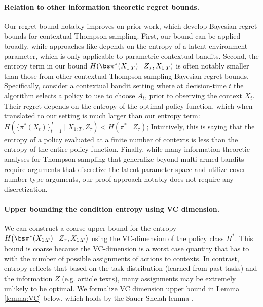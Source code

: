 \paragraph{Relation to other information theoretic regret bounds.} Our regret bound notably improves on prior work, which develop Bayesian regret bounds for contextual Thompson sampling. First, our bound can be applied broadly, while approaches like \citet{neu2022lifting} depends on the entropy of a latent environment parameter, which is only applicable to parametric contextual bandits. Second, the entropy term in our bound $H( \piX \mid Z_\tau, X_{1:T})$ is often notably smaller than those from other contextual Thompson sampling Bayesian regret bounds. Specifically, \citet{infotheoreticNonstationary} consider a contextual bandit setting where at decision-time $t$ the algorithm selects a policy to use to choose $A_t$, prior to observing the context $X_t$. Their regret depends on the entropy of the optimal policy function, which when translated to our setting is much larger than our entropy term:  $H( \{ \pi^*(X_t) \}_{t=1}^T \mid X_{1:T}, Z_\tau) < H ( \pi^* \mid Z_\tau)$; Intuitively, this is saying that the entropy of a policy evaluated at a finite number of contexts is less than the entropy of the entire policy function.
Finally, while many information-theoretic analyses for Thompson sampling that generalize beyond multi-armed bandits require arguments that discretize the latent parameter space \cite{dong2018information,gouverneur2024an,neu2022lifting,infotheoreticNonstationary} and utilize cover-number type arguments, our proof approach notably does not require any discretization.

\paragraph{Upper bounding the condition entropy using VC dimension.} We can construct a coarse upper bound for the entropy $H \big( \piX \mid Z_{\tau}, X_{1:T} \big)$ using the VC-dimension of the policy class $\Pi^*$. This bound is coarse because the VC-dimension is a worst case quantity that has to with the number of possible assignments of actions to contexts. In contrast, entropy reflects that based on the task distribution (learned from past tasks) and the information $Z$ (e.g. article texts), many assignments may be extremely unlikely to be optimal. We formalize VC dimension upper bound in Lemma \ref{lemma:VC} below, which holds by the Sauer-Shelah lemma \citep{sauer1972density,shelah1972combinatorial}.

